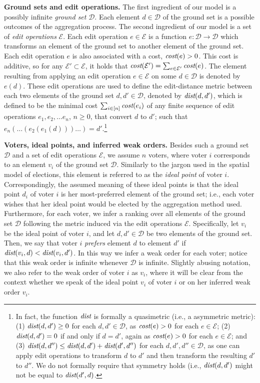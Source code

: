\documentclass[sigconf]{aamas}  %
\newcommand{\mypara}[1]{\smallskip\noindent\textbf{#1.}}
\newcommand{\calD}{\mathcal{D}}
\newcommand{\calE}{\mathcal{E}}
\newcommand{\dist}{\emph{dist}}
\newcommand{\cost}{\emph{cost}}
\begin{document}
\mypara{Ground sets and edit operations}
%
The first ingredient of our model is a possibly infinite \emph{ground set} $\calD$.
Each element $d \in \calD$ of the ground set is a possible outcomes of the aggregation process.
The second ingredient of our model is a set of \emph{edit operations} $\calE$.
Each edit operation $e \in \calE$ is a function $e : \calD \to \calD$ which transforms an element of the ground set to another element of the ground set.
Each edit operation $e$ is also associated with a cost, $\cost(e) > 0$.
This cost is additive, so for any $\calE' \subset \calE$, it holds that $\cost(\calE') = \sum_{e \in \calE'} \cost(e)$.
The element resulting from applying an edit operation $e \in \calE$ on some $d \in \calD$ is denoted by $e(d)$.
These edit operations are used to define the edit-distance metric between each two elements of the ground set $d, d' \in \calD$,
denoted by $\dist(d, d')$, which is defined to be the minimal cost $\sum_{i \in [n]} \cost(e_i)$ of any finite sequence of edit operations $e_1, e_2, \ldots e_n$, $n \ge 0$, that convert $d$ to $d'$;
such that $e_n(\ldots(e_2(e_1(d)))\ldots) = d'$.\footnote{%
In fact, the function $\dist$ is formally a quasimetric (i.e., a asymmetric metric):
  (1) $\dist(d, d') \geq 0$ for each $d, d' \in \calD$, as $\cost(e) > 0$ for each $e \in \calE$;
  (2) $\dist(d, d') = 0$ if and only if $d = d'$, again as $\cost(e) > 0$ for each $e \in \calE$;
  and
  (3) $\dist(d, d'') \leq \dist(d, d') + \dist(d', d'')$ for each $d, d', d'' \in \calD$, as one can apply edit operations to transform $d$ to $d'$ and then transform the resulting $d'$ to $d''$.
We do not formally require that symmetry holds (i.e., $\dist(d, d')$ might not be equal to $\dist(d', d)$.}

\mypara{Voters, ideal points, and inferred weak orders}
%
Besides such a ground set $\calD$ and a set of edit operations $\calE$,
we assume $n$ voters, where voter $i$ corresponds to an element $v_i$ of the ground set $\calD$.
Similarly to the jargon used in the spatial model of elections, this element is referred to as the \emph{ideal point} of voter $i$.
Correspondingly, the assumed meaning of these ideal points is that the ideal point $d_i$ of voter $i$ is her most-preferred element of the ground set;
i.e., each voter wishes that her ideal point would be elected by the aggregation method used.
%
Furthermore, for each voter, we infer a ranking over all elements of the ground set $\calD$ following the metric induced via the edit operations $\calE$.
Specifically, let $v_i$ be the ideal point of voter $i$, and let $d, d' \in \calD$ be two elements of the ground set.
Then, we say that voter $i$ \emph{prefers} element $d$ to element $d'$ if $\dist(v_i, d) < \dist(v_i, d')$.
In this way we infer a weak order for each voter; notice that this weak order is infinite whenever $\calD$ is infinite.
Slightly abusing notation, we also refer to the weak order of voter $i$ as $v_i$,
where it will be clear from the context whether we speak of the ideal point $v_i$ of voter $i$ or on her inferred weak order $v_i$.
\end{document}
